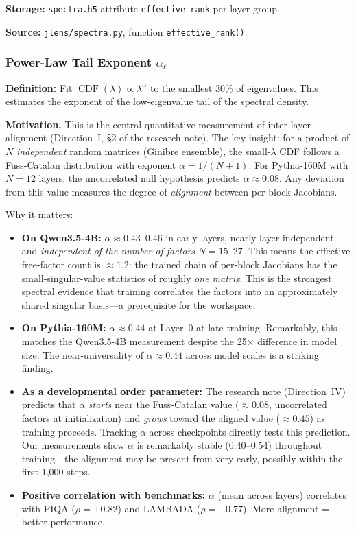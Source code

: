 \documentclass[11pt,a4paper]{article}
\begin{document}
\textbf{Storage:} \texttt{spectra.h5} attribute \texttt{effective\_rank} per layer group.

\textbf{Source:} \texttt{jlens/spectra.py}, function \texttt{effective\_rank()}.

\subsubsection{Power-Law Tail Exponent $\alpha_\ell$}
\label{sec:alpha}

\textbf{Definition:} Fit $\operatorname{CDF}(\lambda) \propto \lambda^{\alpha}$ to the smallest 30\% of eigenvalues. This estimates the exponent of the low-eigenvalue tail of the spectral density.

\textbf{Motivation.} This is the central quantitative measurement of inter-layer alignment (Direction~I, \S2 of the research note). The key insight: for a product of $N$ \emph{independent} random matrices (Ginibre ensemble), the small-$\lambda$ CDF follows a Fuss-Catalan distribution with exponent $\alpha = 1/(N+1)$. For Pythia-160M with $N=12$ layers, the uncorrelated null hypothesis predicts $\alpha \approx 0.08$. Any deviation from this value measures the degree of \emph{alignment} between per-block Jacobians.

Why it matters:
\begin{itemize}
  \item \textbf{On Qwen3.5-4B:} $\alpha \approx 0.43$--$0.46$ in early layers, nearly layer-independent and \emph{independent of the number of factors} $N = 15$--27. This means the effective free-factor count is $\approx 1.2$: the trained chain of per-block Jacobians has the small-singular-value statistics of roughly \emph{one matrix}. This is the strongest spectral evidence that training correlates the factors into an approximately shared singular basis---a prerequisite for the workspace.
  \item \textbf{On Pythia-160M:} $\alpha \approx 0.44$ at Layer~0 at late training. Remarkably, this matches the Qwen3.5-4B measurement despite the 25$\times$ difference in model size. The near-universality of $\alpha \approx 0.44$ across model scales is a striking finding.
  \item \textbf{As a developmental order parameter:} The research note (Direction~IV) predicts that $\alpha$ \emph{starts} near the Fuss-Catalan value ($\approx 0.08$, uncorrelated factors at initialization) and \emph{grows} toward the aligned value ($\approx 0.45$) as training proceeds. Tracking $\alpha$ across checkpoints directly tests this prediction. Our measurements show $\alpha$ is remarkably stable ($0.40$--$0.54$) throughout training---the alignment may be present from very early, possibly within the first 1,000 steps.
  \item \textbf{Positive correlation with benchmarks:} $\alpha$ (mean across layers) correlates with PIQA ($\rho = +0.82$) and LAMBADA ($\rho = +0.77$). More alignment = better performance.
\end{itemize}
\end{document}
